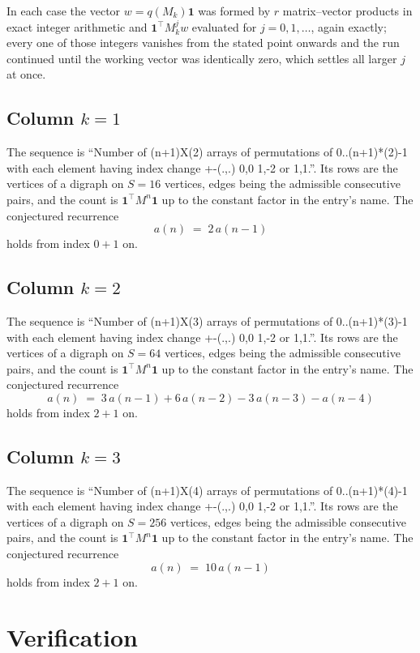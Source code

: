 \documentclass[11pt,a4paper]{article}
\theoremstyle{plain}
\theoremstyle{definition}
\begin{document}
In each case the vector $w=q(M_k)\mathbf{1}$ was formed by $r$ matrix--vector products in
exact integer arithmetic and $\mathbf{1}^{\!\top}M_k^{j}w$ evaluated for $j=0,1,\dots$,
again exactly; every one of those integers vanishes from the stated point onwards and the run
continued until the working vector was identically zero, which settles all larger $j$ at once.

\subsection*{Column $k$$=1$}
The sequence is ``Number of (n+1)X(2) arrays of permutations of 0..(n+1)*(2)-1 with each element having index change +-(.,.) 0,0 1,-2 or 1,1.''. Its rows are the vertices of a digraph on
$S=16$ vertices, edges being the admissible consecutive pairs, and the count is
$\mathbf{1}^{\!\top}M^{n}\mathbf{1}$ up to the constant factor in the entry's name.
The conjectured recurrence
\[
a(n)\;=\;2\,a(n-1)
\]
holds from index $0+1$ on.

\subsection*{Column $k$$=2$}
The sequence is ``Number of (n+1)X(3) arrays of permutations of 0..(n+1)*(3)-1 with each element having index change +-(.,.) 0,0 1,-2 or 1,1.''. Its rows are the vertices of a digraph on
$S=64$ vertices, edges being the admissible consecutive pairs, and the count is
$\mathbf{1}^{\!\top}M^{n}\mathbf{1}$ up to the constant factor in the entry's name.
The conjectured recurrence
\[
a(n)\;=\;3\,a(n-1) + 6\,a(n-2) - 3\,a(n-3) - a(n-4)
\]
holds from index $2+1$ on.

\subsection*{Column $k$$=3$}
The sequence is ``Number of (n+1)X(4) arrays of permutations of 0..(n+1)*(4)-1 with each element having index change +-(.,.) 0,0 1,-2 or 1,1.''. Its rows are the vertices of a digraph on
$S=256$ vertices, edges being the admissible consecutive pairs, and the count is
$\mathbf{1}^{\!\top}M^{n}\mathbf{1}$ up to the constant factor in the entry's name.
The conjectured recurrence
\[
a(n)\;=\;10\,a(n-1)
\]
holds from index $2+1$ on.

\section{Verification}
\end{document}
